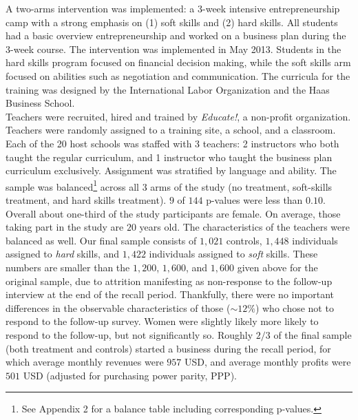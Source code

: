 A two-arms intervention was implemented: a 3-week intensive entrepreneurship camp with a strong emphasis on (1) soft skills and (2) hard skills. All students had a basic overview entrepreneurship and worked on a business plan during the 3-week course. The intervention was implemented in May 2013. Students in the hard skills program focused on financial decision making, while the soft skills arm focused on abilities such as negotiation and communication. The curricula for the training was designed by the International Labor Organization and the Haas Business School.\\

Teachers were recruited, hired and trained by \textit{Educate!}, a non-profit organization. Teachers were randomly assigned to a training site, a school, and a classroom. Each of the 20 host schools was staffed with 3 teachers: 2 instructors who both taught the regular curriculum, and 1 instructor who taught the business plan curriculum exclusively. Assignment was stratified by language and ability. The sample was balanced\footnote{See Appendix 2 for a balance table including corresponding p-values.} across all 3 arms of the study (no treatment, soft-skills treatment, and hard skills treatment). $9$ of $144$ p-values were less than $0.10$. Overall about one-third of the study participants are female. On average, those taking part in the study are $20$ years old. The characteristics of the teachers were balanced as well. Our final sample consists of $1,021$ controls, $1,448$ individuals assigned to \textit{hard} skills, and $1,422$ individuals assigned to \textit{soft} skills. These numbers are smaller than the $1,200$, $1,600$, and $1,600$ given above for the original sample, due to attrition manifesting as non-response to the follow-up interview at the end of the recall period. Thankfully, there were no important differences in the observable characteristics of those ($\sim 12\%$) who chose not to respond to the follow-up survey. Women were slightly likely more likely to respond to the follow-up, but not significantly so. Roughly $2/3$ of the final sample (both treatment and controls) started a business during the recall period, for which average monthly revenues were $957$ USD, and average monthly profits were $501$ USD (adjusted for purchasing power parity, PPP).\\


